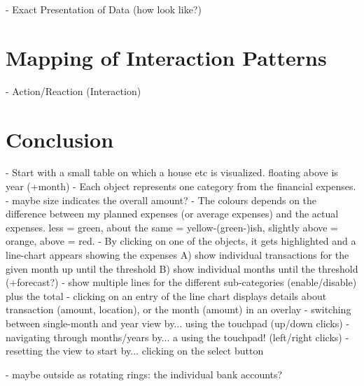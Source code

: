 - Exact Presentation of Data (how look like?)



\section{Mapping of Interaction Patterns}

- Action/Reaction (Interaction)





\section{Conclusion}




- Start with a small table on which a house etc is visualized. floating above is year (+month)
- Each object represents one category from the financial expenses.
- maybe size indicates the overall amount?
- The colours depends on the difference between my planned expenses (or average expenses) and the actual expenses. less = green, about the same = yellow-(green-)ish, slightly above = orange, above = red.
- By clicking on one of the objects, it gets highlighted and a line-chart appears showing the expenses
   A) show individual transactions for the given month up until the threshold
   B) show individual months until the threshold (+forecast?)
- show multiple lines for the different sub-categories (enable/disable) plus the total
- clicking on an entry of the line chart displays details about transaction (amount, location), or the month (amount) in an overlay
- switching between single-month and year view by... using the touchpad (up/down clicks)
- navigating through months/years by... a using the touchpad! (left/right clicks)
- resetting the view to start by... clicking on the select button

- maybe outside as rotating rings: the individual bank accounts?

